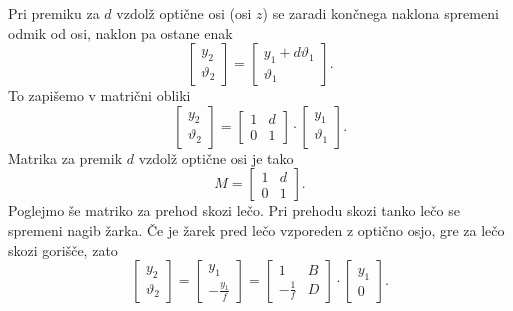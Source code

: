 Pri premiku za $d$ vzdolž optične osi (osi $z$) se zaradi končnega naklona 
spremeni odmik od osi, naklon pa ostane enak
\begin{equation}
\left[\begin{array}{c}
y_{2}\\
\vartheta_{2}
\end{array}\right]=\left[\begin{array}{c}
y_{1}+d\vartheta_{1}\\
\vartheta_{1}
\end{array}\right].
\end{equation}
To zapišemo v matrični obliki
\begin{equation}
\left[\begin{array}{c}
y_{2}\\
\vartheta_{2}
\end{array}\right]=\left[\begin{array}{cc}
1 & d\\
0 & 1
\end{array}\right]\cdot\left[\begin{array}{c}
y_{1}\\
\vartheta_{1}
\end{array}\right].
\end{equation}
Matrika za premik $d$ vzdolž optične osi je tako
\begin{equation}
M= \left[\begin{array}{cc}
1 & d\\
0 & 1
\end{array}\right].
\label{eq:MABCD1}
\end{equation}
Poglejmo še matriko za prehod skozi lečo. 
Pri prehodu skozi tanko lečo se spremeni nagib žarka. Če je žarek pred
lečo vzporeden z optično osjo, gre za lečo skozi gorišče, zato 
\begin{equation}
\left[\begin{array}{c}
y_{2}\\
\vartheta_{2}
\end{array}\right]=\left[\begin{array}{c}
y_{1}\\
-\frac{y_{1}}{f}
\end{array}\right]=\left[\begin{array}{cc}
1 & B\\
-\frac{1}{f} & D
\end{array}\right]\cdot\left[\begin{array}{c}
y_{1}\\
0
\end{array}\right].
\end{equation}
